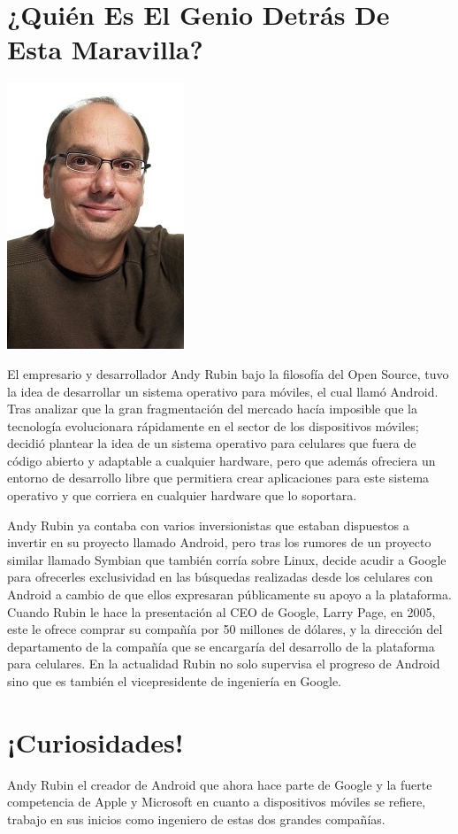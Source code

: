 \section*{¿Quién Es El Genio Detrás De Esta Maravilla?}
\includegraphics[scale=1]{img/cp05/img0502.png}

El empresario y desarrollador Andy Rubin bajo la filosofía del Open Source, tuvo la idea de desarrollar un sistema operativo para móviles, el cual llamó Android. Tras 
analizar que la gran fragmentación del mercado hacía imposible que la tecnología evolucionara rápidamente en el sector de los dispositivos móviles; decidió plantear la idea 
de un sistema operativo para celulares que fuera de código abierto y adaptable a cualquier hardware, pero que además ofreciera un entorno de desarrollo libre que permitiera 
crear aplicaciones para este sistema operativo y que corriera en cualquier hardware que lo soportara.

Andy Rubin ya contaba con varios inversionistas que estaban dispuestos a invertir en su proyecto llamado Android, pero tras los rumores de un proyecto similar llamado 
Symbian que también corría sobre Linux, decide acudir a Google para ofrecerles exclusividad en las búsquedas realizadas desde los celulares con Android a cambio de que 
ellos expresaran públicamente su apoyo a la plataforma. Cuando Rubin le hace la presentación al CEO de Google, Larry Page, en 2005, este le ofrece comprar su compañía por 
50 millones de dólares, y la dirección del departamento de la compañía que se encargaría del desarrollo de la plataforma para celulares. En la actualidad Rubin no solo 
supervisa el progreso de Android sino que es también el vicepresidente de ingeniería en Google.

\section*{¡Curiosidades!}
Andy Rubin el creador de Android que ahora hace parte de Google y la fuerte competencia de Apple y Microsoft en cuanto a dispositivos móviles se refiere, trabajo en sus 
inicios como ingeniero de estas dos grandes compañías.

